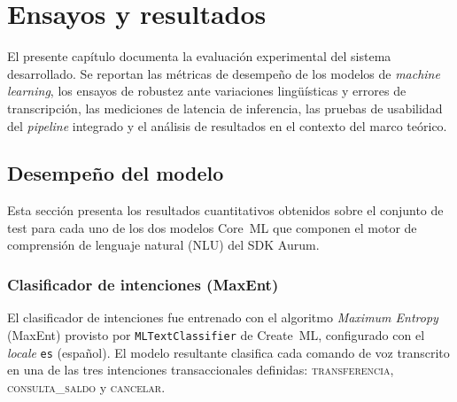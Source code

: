 \chapter{Ensayos y resultados}
\label{Chapter4}

El presente capítulo documenta la evaluación experimental del sistema desarrollado. Se reportan las métricas de desempeño de los modelos de \textit{machine learning}, los ensayos de robustez ante variaciones lingüísticas y errores de transcripción, las mediciones de latencia de inferencia, las pruebas de usabilidad del \textit{pipeline} integrado y el análisis de resultados en el contexto del marco teórico.

\section{Desempeño del modelo}
\label{sec:desempeno}

Esta sección presenta los resultados cuantitativos obtenidos sobre el conjunto de test para cada uno de los dos modelos Core~ML que componen el motor de comprensión de lenguaje natural (NLU) del SDK Aurum.

\subsection{Clasificador de intenciones (MaxEnt)}
\label{subsec:desempeno-intent}

El clasificador de intenciones fue entrenado con el algoritmo \textit{Maximum Entropy} (MaxEnt) provisto por \texttt{MLTextClassifier} de
Create~ML, configurado con el \textit{locale} \texttt{es} (español). El modelo resultante clasifica cada comando de voz transcrito en una de las tres
intenciones transaccionales definidas: \textsc{transferencia}, \textsc{consulta\_saldo} y \textsc{cancelar}.

